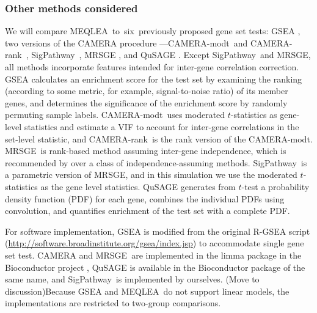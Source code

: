 \documentclass[a4,center,fleqn]{NAR}
\newcommand{\OurMethod}{MEQLEA}
\newcommand{\HowmanyTest}{six}
\newcommand{\CMR}{CAMERA-rank}
\newcommand{\CMT}{CAMERA-modt}
\newcommand{\gent}{SigPathway}
\newcommand{\genr}{MRSGE}
\begin{document}
	
	\subsubsection{Other methods considered}
	
	We will compare \OurMethod~to~\HowmanyTest~previously proposed gene set tests: GSEA
	\citep{subramanian2005gene}, two versions of the CAMERA procedure ---\CMT~and
	\CMR~\citep{wu2012camera}, \gent~\citep{tian2005discovering}, MRSGE \citep{michaud2008integrative},
	and QuSAGE \citep{yaari2013quantitative}. Except \gent~and MRSGE, all methods incorporate features intended for inter-gene correlation correction. GSEA calculates an enrichment score for the test set by examining the ranking (according to some metric, for example, signal-to-noise ratio) of its member genes, and determines the significance of the enrichment score by randomly permuting sample labels. \CMT~uses moderated $t$-statistics \citep{Smyth2004moderated} as gene-level statistics and estimate a VIF to account for inter-gene correlations in the set-level statistic, and \CMR~is the rank version of the \CMT.
	\genr~is rank-based method assuming inter-gene independence, which is recommended by \cite{tarca2013comparison} over a class of independence-assuming methods. \gent~is a parametric version of \genr, and in this simulation we use the moderated $t$-statistics as the gene level statistics. 
	QuSAGE generates
	from $t$-test a probability density function (PDF) for each gene, combines the individual PDFs using
	convolution, and quantifies enrichment of the test set with a complete PDF. 
	
	
	For software implementation, GSEA is modified from the original R-GSEA script
	(\url{http://software.broadinstitute.org/gsea/index.jsp}) to accommodate single gene set test.
	CAMERA and \genr~are implemented in the limma package \citep{smyth2005limma} in the Bioconductor
	project \citep{gentleman2004bioconductor}, QuSAGE is available in the Bioconductor package of the
	same name, and \gent~is implemented by ourselves. (Move to discussion)Because GSEA and \OurMethod~do not support linear models, the implementations are restricted to two-group comparisons.
	
\end{document}
